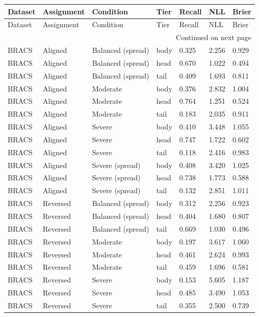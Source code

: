 \begin{longtable}{lllllll}
\toprule
Dataset & Assignment & Condition & Tier & Recall & NLL & Brier \\
\midrule
\endfirsthead
\toprule
Dataset & Assignment & Condition & Tier & Recall & NLL & Brier \\
\midrule
\endhead
\midrule
\multicolumn{7}{r}{Continued on next page} \\
\midrule
\endfoot
\bottomrule
\endlastfoot
BRACS & Aligned & Balanced (spread) & body & 0.325 & 2.256 & 0.929 \\
BRACS & Aligned & Balanced (spread) & head & 0.670 & 1.022 & 0.494 \\
BRACS & Aligned & Balanced (spread) & tail & 0.409 & 1.693 & 0.811 \\
BRACS & Aligned & Moderate & body & 0.376 & 2.832 & 1.004 \\
BRACS & Aligned & Moderate & head & 0.764 & 1.251 & 0.524 \\
BRACS & Aligned & Moderate & tail & 0.183 & 2.035 & 0.911 \\
BRACS & Aligned & Severe & body & 0.410 & 3.448 & 1.055 \\
BRACS & Aligned & Severe & head & 0.747 & 1.722 & 0.602 \\
BRACS & Aligned & Severe & tail & 0.118 & 2.416 & 0.983 \\
BRACS & Aligned & Severe (spread) & body & 0.408 & 3.420 & 1.025 \\
BRACS & Aligned & Severe (spread) & head & 0.738 & 1.773 & 0.588 \\
BRACS & Aligned & Severe (spread) & tail & 0.132 & 2.851 & 1.011 \\
BRACS & Reversed & Balanced (spread) & body & 0.312 & 2.256 & 0.923 \\
BRACS & Reversed & Balanced (spread) & head & 0.404 & 1.680 & 0.807 \\
BRACS & Reversed & Balanced (spread) & tail & 0.669 & 1.030 & 0.496 \\
BRACS & Reversed & Moderate & body & 0.197 & 3.617 & 1.060 \\
BRACS & Reversed & Moderate & head & 0.461 & 2.624 & 0.993 \\
BRACS & Reversed & Moderate & tail & 0.459 & 1.696 & 0.581 \\
BRACS & Reversed & Severe & body & 0.153 & 5.605 & 1.187 \\
BRACS & Reversed & Severe & head & 0.485 & 3.490 & 1.053 \\
BRACS & Reversed & Severe & tail & 0.355 & 2.500 & 0.739 \\

\end{longtable}
